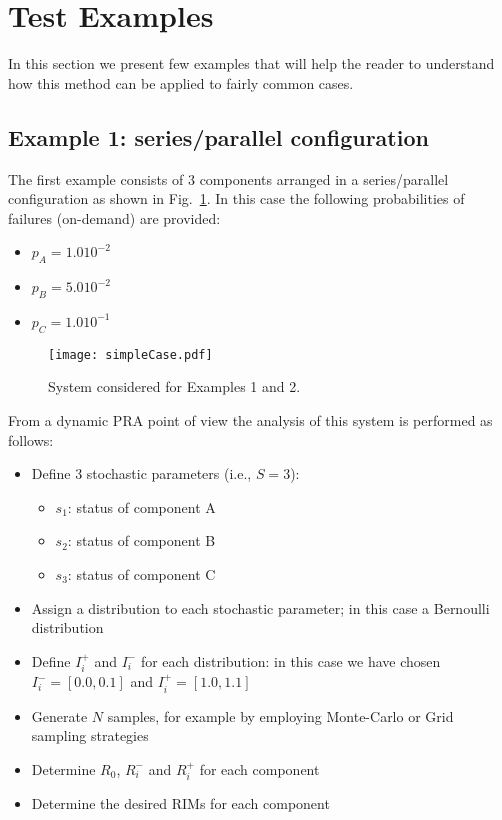 \section{Test Examples}
\label{sec:test}

In this section we present few examples that will help the reader to understand 
how this method can be applied to fairly common cases.

\subsection{Example 1: series/parallel configuration}
\label{sec:example1}

The first example consists of 3 components 
arranged in a series/parallel configuration as shown in Fig.~\ref{fig:example12}. 
In this case the following probabilities of failures (on-demand) are provided:
\begin{itemize}
  \item $p_A = 1.0 10^{-2}$
  \item $p_B = 5.0 10^{-2}$
  \item $p_C = 1.0 10^{-1}$
\end{itemize}

\begin{figure}
    \centering
    \centerline{\texttt{[image: simpleCase.pdf]}}
    \caption{System considered for Examples 1 and 2.}
    \label{fig:example12}
\end{figure}
  
From a dynamic PRA point of view the analysis of this system is performed as follows:
\begin{itemize}
  \item Define 3 stochastic parameters (i.e., $S=3$):
    \begin{itemize}
      \item $s_1$: status of component A
      \item $s_2$: status of component B
      \item $s_3$: status of component C
    \end{itemize}
  \item Assign a distribution to each stochastic parameter; in this case a Bernoulli 
        distribution  
  \item Define $I_i^+$ and $I_i^-$ for each distribution: in this case we have chosen 
        $I_i^-=[0.0,0.1]$ and $I_i^+=[1.0,1.1]$ 
  \item Generate $N$ samples, for example by employing Monte-Carlo or Grid sampling strategies
  \item Determine $R_0$, $R_i^-$ and $R_i^+$ for each component 
  \item Determine the desired RIMs for each component
\end{itemize}

